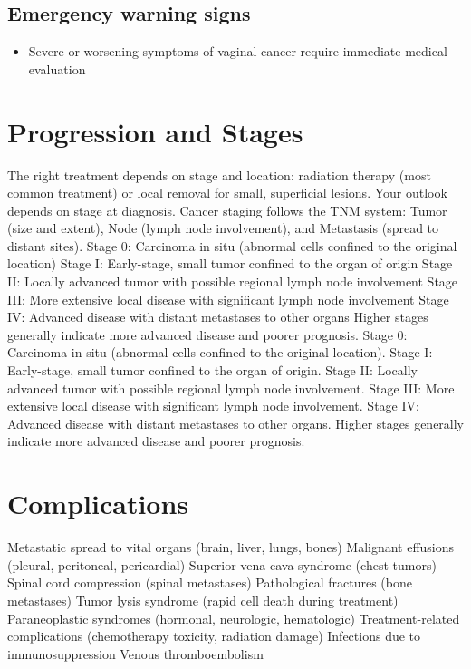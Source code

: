 \subsection{Emergency warning signs}
\begin{itemize}[noitemsep]
  \item Severe or worsening symptoms of vaginal cancer require immediate medical evaluation
\end{itemize}
\section{Progression and Stages}
The right treatment depends on stage and location: radiation therapy (most common treatment) or local removal for small, superficial lesions. Your outlook depends on stage at diagnosis. Cancer staging follows the TNM system: Tumor (size and extent), Node (lymph node involvement), and Metastasis (spread to distant sites). Stage 0: Carcinoma in situ (abnormal cells confined to the original location) Stage I: Early-stage, small tumor confined to the organ of origin Stage II: Locally advanced tumor with possible regional lymph node involvement Stage III: More extensive local disease with significant lymph node involvement Stage IV: Advanced disease with distant metastases to other organs Higher stages generally indicate more advanced disease and poorer prognosis. Stage 0: Carcinoma in situ (abnormal cells confined to the original location). Stage I: Early-stage, small tumor confined to the organ of origin. Stage II: Locally advanced tumor with possible regional lymph node involvement. Stage III: More extensive local disease with significant lymph node involvement. Stage IV: Advanced disease with distant metastases to other organs. Higher stages generally indicate more advanced disease and poorer prognosis.
\section{Complications}
Metastatic spread to vital organs (brain, liver, lungs, bones) Malignant effusions (pleural, peritoneal, pericardial) Superior vena cava syndrome (chest tumors) Spinal cord compression (spinal metastases) Pathological fractures (bone metastases) Tumor lysis syndrome (rapid cell death during treatment) Paraneoplastic syndromes (hormonal, neurologic, hematologic) Treatment-related complications (chemotherapy toxicity, radiation damage) Infections due to immunosuppression Venous thromboembolism


